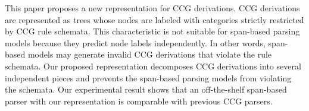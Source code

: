 This paper proposes a new representation for CCG derivations. CCG derivations are represented as trees whose nodes are labeled with categories strictly restricted by CCG rule schemata. This characteristic is not suitable for span-based parsing models because they predict node labels independently. In other words, span-based models may generate invalid CCG derivations that violate the rule schemata. Our proposed representation decomposes CCG derivations into several independent pieces and prevents the span-based parsing models from violating the schemata. Our experimental result shows that an off-the-shelf span-based parser with our representation is comparable with previous CCG parsers.
